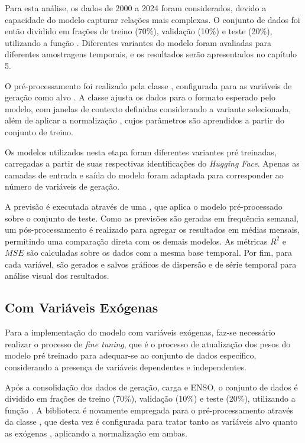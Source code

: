 Para esta análise, os dados de 2000 a 2024 foram considerados, devido a capacidade do modelo capturar relações mais complexas. 
O conjunto de dados foi então dividido em frações de treino (70\%), validação (10\%) e teste (20\%), utilizando a função 
. Diferentes variantes do modelo foram avaliadas para diferentes amostragens temporais, e os resultados 
serão apresentados no capítulo 5.

O pré-processamento foi realizado pela classe , configurada para as variáveis de geração como 
alvo . A classe ajusta os dados para o formato esperado pelo modelo, com janelas de contexto definidas
considerando a variante selecionada, além de aplicar a normalização , cujos parâmetros são aprendidos 
a partir do conjunto de treino.

Os modelos  utilizados nesta etapa foram diferentes variantes pré treinadas, carregadas a partir
de suas respectivas identificações do \textit{Hugging Face}. Apenas as camadas de entrada e saída do modelo foram adaptada para corresponder 
ao número de variáveis de geração.

A previsão é executada através de uma , que aplica o modelo pré-processado sobre o conjunto 
de teste. Como as previsões são geradas em frequência semanal, um pós-processamento é realizado para agregar os resultados em 
médias mensais, permitindo uma comparação direta com os demais modelos. As métricas $R^2$ e $MSE$ são calculadas sobre os dados 
com a mesma base temporal. Por fim, para cada variável, são gerados e salvos gráficos de dispersão e de série temporal para 
análise visual dos resultados.


\subsection{Com Variáveis Exógenas} %
Para a implementação do modelo com variáveis exógenas, faz-se necessário realizar o processo de \textit{fine tuning}, que 
é o processo de atualização dos pesos do modelo pré treinado para adequar-se ao conjunto de dados específico, considerando
a presença de variáveis dependentes e independentes.

Após a consolidação dos dados de geração, carga e ENSO, o conjunto de dados é dividido em frações de treino (70\%), validação 
(10\%) e teste (20\%), utilizando a função . A biblioteca  é novamente empregada 
para o pré-processamento através da classe , que desta vez é configurada para tratar tanto as variáveis 
alvo  quanto as exógenas , aplicando a normalização  em ambas.

